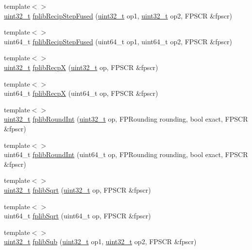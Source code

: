 \begin{DoxyCompactItemize}
\item 
{\footnotesize template$<$$>$ }\\\hyperlink{Type_8hh_a435d1572bf3f880d55459d9805097f62}{uint32\_\-t} \hyperlink{namespaceArmISA_a1cb770590af9161319a168035eea258d}{fplibRecipStepFused} (\hyperlink{Type_8hh_a435d1572bf3f880d55459d9805097f62}{uint32\_\-t} op1, \hyperlink{Type_8hh_a435d1572bf3f880d55459d9805097f62}{uint32\_\-t} op2, FPSCR \&fpscr)
\item 
{\footnotesize template$<$$>$ }\\uint64\_\-t \hyperlink{namespaceArmISA_a88aa4942c898d4ae0d9ee5e83f18e990}{fplibRecipStepFused} (uint64\_\-t op1, uint64\_\-t op2, FPSCR \&fpscr)
\item 
{\footnotesize template$<$$>$ }\\\hyperlink{Type_8hh_a435d1572bf3f880d55459d9805097f62}{uint32\_\-t} \hyperlink{namespaceArmISA_a92558db61b13348bea996a347e807cce}{fplibRecpX} (\hyperlink{Type_8hh_a435d1572bf3f880d55459d9805097f62}{uint32\_\-t} op, FPSCR \&fpscr)
\item 
{\footnotesize template$<$$>$ }\\uint64\_\-t \hyperlink{namespaceArmISA_a979b5637f94e8f08eb0975ab140add28}{fplibRecpX} (uint64\_\-t op, FPSCR \&fpscr)
\item 
{\footnotesize template$<$$>$ }\\\hyperlink{Type_8hh_a435d1572bf3f880d55459d9805097f62}{uint32\_\-t} \hyperlink{namespaceArmISA_a6868618a91c5e94f964e05c0dca0c118}{fplibRoundInt} (\hyperlink{Type_8hh_a435d1572bf3f880d55459d9805097f62}{uint32\_\-t} op, FPRounding rounding, bool exact, FPSCR \&fpscr)
\item 
{\footnotesize template$<$$>$ }\\uint64\_\-t \hyperlink{namespaceArmISA_ad37c4d61469775f44abb3c133f07ce7a}{fplibRoundInt} (uint64\_\-t op, FPRounding rounding, bool exact, FPSCR \&fpscr)
\item 
{\footnotesize template$<$$>$ }\\\hyperlink{Type_8hh_a435d1572bf3f880d55459d9805097f62}{uint32\_\-t} \hyperlink{namespaceArmISA_ad32495f160fbc72be7ab48a53b25b11c}{fplibSqrt} (\hyperlink{Type_8hh_a435d1572bf3f880d55459d9805097f62}{uint32\_\-t} op, FPSCR \&fpscr)
\item 
{\footnotesize template$<$$>$ }\\uint64\_\-t \hyperlink{namespaceArmISA_acd9428eb95f8827df7cc066ca19f6fec}{fplibSqrt} (uint64\_\-t op, FPSCR \&fpscr)
\item 
{\footnotesize template$<$$>$ }\\\hyperlink{Type_8hh_a435d1572bf3f880d55459d9805097f62}{uint32\_\-t} \hyperlink{namespaceArmISA_aeb0bc3ee8ee781a2038e66289a323a7d}{fplibSub} (\hyperlink{Type_8hh_a435d1572bf3f880d55459d9805097f62}{uint32\_\-t} op1, \hyperlink{Type_8hh_a435d1572bf3f880d55459d9805097f62}{uint32\_\-t} op2, FPSCR \&fpscr)

\end{DoxyCompactItemize}
